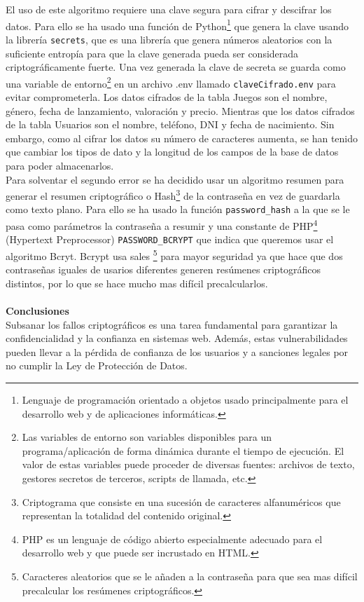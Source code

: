 \documentclass[a4paper,12pt]{article}
\newcommand{\code}[1]{\texttt{#1}}  %
\begin{document}
El uso de este algoritmo requiere una clave segura para cifrar y descifrar los datos. Para ello se ha usado una función\cite{generador_claves_python} de Python\footnote{Lenguaje de programación orientado a objetos usado principalmente para el desarrollo web y de aplicaciones informáticas.} que genera la clave usando la librería \code{secrets}, que es una librería que genera números aleatorios con la suficiente entropía para  que la clave generada pueda ser considerada criptográficamente fuerte\cite{secrets Python}. 
Una vez generada la clave de secreta se guarda como una variable de entorno\footnote{Las variables de entorno son variables disponibles para un programa/aplicación de forma dinámica durante el tiempo de ejecución. El valor de estas variables puede proceder de diversas fuentes: archivos de texto, gestores secretos de terceros, scripts de llamada, etc.\cite{Variable de entorno}} en un archivo .env llamado \code{claveCifrado.env} para evitar comprometerla. Los datos cifrados de la tabla Juegos son el nombre, género, fecha de lanzamiento, valoración y precio. Mientras que los datos cifrados de la tabla Usuarios son el nombre, teléfono, DNI y fecha de nacimiento. Sin embargo, como al cifrar los datos su número de caracteres aumenta, se han tenido que cambiar los tipos de dato y la longitud de los campos de la base de datos para poder almacenarlos.\\ 

Para solventar el segundo error se ha decidido usar un algoritmo resumen para generar el resumen criptográfico o Hash\footnote{Criptograma que consiste en una sucesión de caracteres alfanuméricos que representan la totalidad del contenido original.} de la contraseña en vez de guardarla como texto plano. Para ello se ha usado la función \code{password\_hash} a la que se le pasa como parámetros la contraseña a resumir y una constante de PHP\footnote{PHP es un lenguaje de código abierto especialmente adecuado para el desarrollo web y que puede ser incrustado en HTML.\cite{def_php}} (Hypertext Preprocessor) \code{PASSWORD\_BCRYPT} que indica que queremos usar el algoritmo Bcryt\cite{Bcrypt}. Bcrypt usa sales \footnote{Caracteres aleatorios que se le añaden a la contraseña para que sea mas difícil precalcular los resúmenes criptográficos.} para mayor seguridad ya que hace que dos contraseñas iguales de usarios diferentes generen resúmenes criptográficos distintos, por lo que se hace mucho mas difícil precalcularlos.\\ 
\\\textbf{Conclusiones}\\
Subsanar los fallos criptográficos es una tarea fundamental para garantizar la confidencialidad y la confianza en sistemas web. Además, estas vulnerabilidades pueden llevar a la pérdida de confianza de los usuarios y a sanciones legales por no cumplir la Ley de Protección de Datos\cite{Ley proteccion de datos}.\\ 
\end{document}
